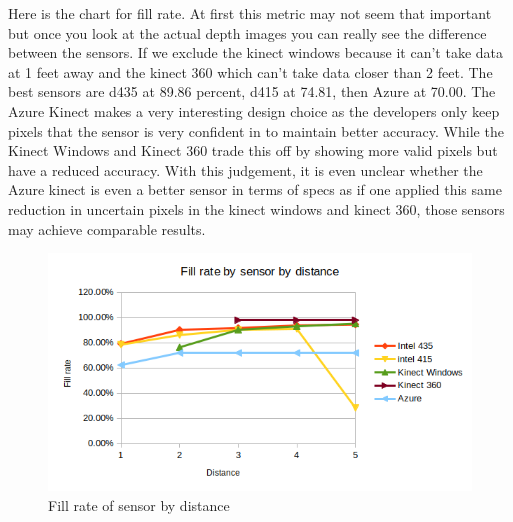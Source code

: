 Here is the chart for fill rate. At first this metric may not seem that important but once you look at the actual depth images you can really see the difference between the sensors. If we exclude the kinect windows because it can't take data at 1 feet away and the kinect 360 which can't take data closer than 2 feet. The best sensors are d435 at 89.86 percent, d415 at 74.81, then Azure at 70.00. The Azure Kinect makes a very interesting design choice as the developers only keep pixels that the sensor is very confident in to maintain better accuracy. While the Kinect Windows and Kinect 360 trade this off by showing more valid pixels but have a reduced accuracy. With this judgement, it is even unclear whether the Azure kinect is even a better sensor in terms of specs as if one applied this same reduction in uncertain pixels in the kinect windows and kinect 360, those sensors may achieve comparable results.

\begin{figure}[h]
	\caption{Fill rate of sensor by distance}
	\centering
	\includegraphics[]{images/fill_rate.png}
\end{figure}

